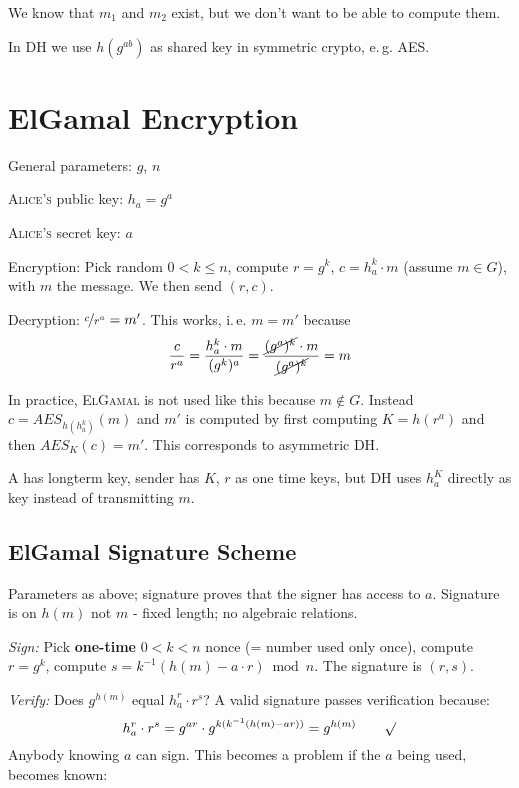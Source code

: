 \begin{remark}
We know that $m_1$ and $m_2$ exist, but we don't want to be able to compute them.
\end{remark}

In \textsc{DH} we use $h(g^{ab})$ as shared key in symmetric crypto, e.\,g. \textsc{AES}.

\section{ElGamal Encryption}

General parameters: $g$, $n$

\textsc{Alice's} public key: $h_a = g^a$

\textsc{Alice's} secret key: $a$

Encryption: Pick random $0<k \leq n$, compute $r=g^k$, $c=h_a^k \cdot m$ (assume $m \in G$), with $m$ the message. We then send $(r,c)$.

Decryption: $\nicefrac{c}{r^a} = m'$. This works, i.\,e. $m=m'$ because
\[
	\frac{c}{r^a} = \frac{h_a^k \cdot m}{(g^k)^a} = \frac{\cancel{(g^a)^k} \cdot m}{\cancel{(g^a)^k}} = m
\]

In practice, \textsc{ElGamal} is not used like this because $m \not \in G$. Instead $c= AES_{h(h_a^k)}(m)$ and $m'$ is computed by first computing $K = h(r^a)$ and then $AES_K(c) = m'$. This corresponds to asymmetric \textsc{DH}.

\textsc{A} has longterm key, sender has $K$, $r$ as one time keys, but \textsc{DH} uses $h_a^K$ directly as key instead of transmitting $m$.

\subsection{ElGamal Signature Scheme}

Parameters as above; signature proves that the signer has access to $a$. Signature is on $h(m)$ not $m$ - fixed length; no algebraic relations.

\emph{Sign:} Pick \textbf{one-time} $0<k<n$ nonce (= number used only once), compute $r=g^k$, compute $s=k^{-1}(h(m) - a \cdot r) \bmod n$. The signature is $(r,s)$.

\emph{Verify:} Does $g^{h(m)}$ equal $h_a^r \cdot r^s$? A valid signature passes verification because:
\[
	h_a^r \cdot r^s = g^{ar} \cdot g^{k(k^{-1}(h(m) - ar))} = g^{h(m)} \qquad \surd
\]
Anybody knowing $a$ can sign. This becomes a problem if the $a$ being used, becomes known:

